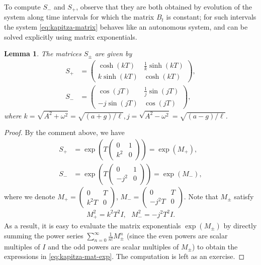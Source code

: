 \documentclass[12pt]{amsart}
\newcommand{\eq}[1]{\begin{equation}\begin{split}#1\end{split}\end{equation}}
\newcommand{\eqst}[1]{\begin{align*}#1\end{align*}}
\newtheorem{lem}[thm]{Lemma}
\newcounter{exercise}
\begin{document}
To compute $S_-$ and $S_+$, observe that they are both obtained by evolution of the system along time intervals for which the matrix $B_t$ is constant; for such intervals the system \eqref{eq:kapitza-matrix} behaves like an autonomous system, and can be solved explicitly using matrix exponentials.

\begin{lem} The matrices $S_\pm$ are given by
\eq{
S_+ &= \left(\begin{array}{cc}
\cosh\left(kT\right) & \frac{1}{k}\sinh\left(kT\right) 
\\[5pt] 
k\sinh\left(kT\right) & \cosh\left(kT\right)
\end{array}\right),
\\[3pt]
S_- &= \left(\begin{array}{cc}
\cos\left(jT\right) & \frac{1}{j}\sin\left(jT\right) 
\\[5pt] 
-j\sin\left(jT\right) & \cos\left(jT\right)
\end{array}\right),
\label{eq:kapitza-mat-exp}
}
where $k=\sqrt{A^2+\omega^2}=\sqrt{(a+g)/\ell}, j=\sqrt{A^2-\omega^2}=\sqrt{(a-g)/\ell}$.
\end{lem}

\begin{proof}
By the comment above, we have
\eqst{
S_+ &= \exp\left(T \left(\begin{array}{cc} 0 & 1 \\ k^2 & 0
\end{array} \right) \right) = \exp(M_+), \\
S_- &= \exp\left(T \left(\begin{array}{cc} 0 & 1 \\ -j^2 & 0
\end{array} \right) \right) = \exp(M_-),
}
where we denote $ M_+ = \left(\begin{array}{cc} 0 & T \\ k^2T & 0
\end{array}\right)$,
$ M_- = \left(\begin{array}{cc} 0 & T \\ -j^2 T & 0
\end{array}\right)$. Note that $M_\pm$ satisfy
\eqst{
M_+^2 = k^2 T^2 I, \ \ \ 
M_-^2 = -j^2 T^2 I.
}
As a result, it is easy to evaluate the matrix exponentials $\exp(M_\pm)$ by directly summing the power series $\sum_{n=0}^\infty \frac{1}{n!}M_{\pm}^n$ (since the even powers are scalar multiples of $I$ and the odd powers are scalar multiples of $M_\pm$) to obtain the expressions in \eqref{eq:kapitza-mat-exp}. The computation is left as an exercise.
\end{proof}
\end{document}
